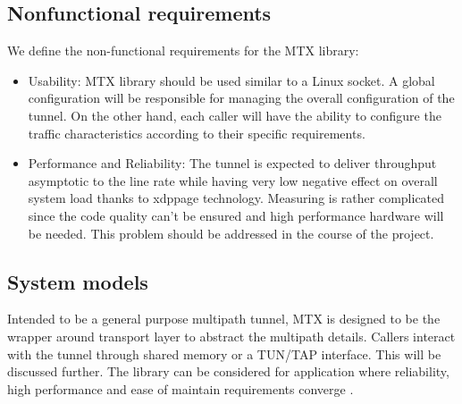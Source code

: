 \subsection{Nonfunctional requirements}
We define the non-functional requirements for the \ac{MTX} library:
\begin{itemize}
    \item Usability: \ac{MTX} library should be used similar to a Linux socket. A global configuration will be responsible for managing the overall configuration of the tunnel. On the other hand, each caller will have the ability to configure the traffic characteristics according to their specific requirements.
    \item Performance and Reliability: The tunnel is expected to deliver throughput asymptotic to the line rate while having very low negative effect on overall system load thanks to \ac{xdppage} technology. Measuring is rather complicated since the code quality can't be ensured and high performance hardware will be needed. This problem should be addressed in the course of the project.
\end{itemize}

\subsection{System models}
Intended to be a general purpose multipath tunnel, \ac{MTX} is designed to be the wrapper around transport layer to abstract the multipath details.
Callers interact with the tunnel through shared memory or a TUN/TAP interface. This will be discussed further.
The library can be considered for application where reliability, high performance and ease of maintain requirements converge .





